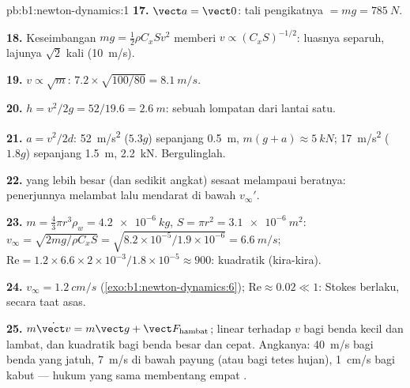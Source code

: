 \begin{solution}{pb:b1:newton-dynamics:1}
\textbf{17.} $\vect a = \vect 0$:  tali pengikatnya $= mg = \qty{785}{N}$.

\textbf{18.} Keseimbangan $mg = \tfrac12\rho C_xSv^2$ memberi $v \propto (C_xS)^{-1/2}$:
luasnya separuh, lajunya $\sqrt2$ kali (\qty{10}{m/s}).

\textbf{19.} $v \propto \sqrt m$: $7.2 \times \sqrt{100/80} = \qty{8.1}{m/s}$.

\textbf{20.} $h = v^2/2g = 52/19.6 = \qty{2.6}{m}$: sebuah lompatan dari
lantai satu.

\textbf{21.} $a = v^2/2d$: \qty{52}{m/s^2} ($5.3g$) sepanjang \qty{0.5}{m},
 $m(g + a) \approx \qty{5}{kN}$; \qty{17}{m/s^2} ($1.8g$) sepanjang
\qty{1.5}{m}, \qty{2.2}{kN}. Bergulinglah.

\textbf{22.}  yang lebih besar (dan sedikit  angkat)
sesaat melampaui beratnya: penerjunnya melambat lalu mendarat di bawah $v_\infty'$.

\textbf{23.} $m = \tfrac43\pi r^3\rho_w = \qty{4.2e-6}{kg}$, $S = \pi r^2 =
\qty{3.1e-6}{m^2}$: $v_\infty = \sqrt{2mg/\rho C_xS} = \sqrt{8.2\times10^{-5}/
1.9\times10^{-6}} = \qty{6.6}{m/s}$; $\mathrm{Re} = 1.2 \times 6.6 \times
2\times10^{-3}/1.8\times10^{-5} \approx 900$: kuadratik (kira-kira).

\textbf{24.} $v_\infty = \qty{1.2}{cm/s}$ (\cref{exo:b1:newton-dynamics:6});
$\mathrm{Re} \approx 0.02 \ll 1$: Stokes berlaku, secara taat asas.

\textbf{25.} $m\dot{\vect v} = m\vect g + \vect F_{\text{hambat}}$;  linear terhadap $v$ bagi benda kecil dan lambat, dan kuadratik
bagi benda besar dan cepat. Angkanya: \qty{40}{m/s} bagi benda yang
jatuh, \qty{7}{m/s} di bawah payung (atau bagi tetes hujan),
\qty{1}{cm/s} bagi kabut --- hukum yang sama membentang empat .
\end{solution}
